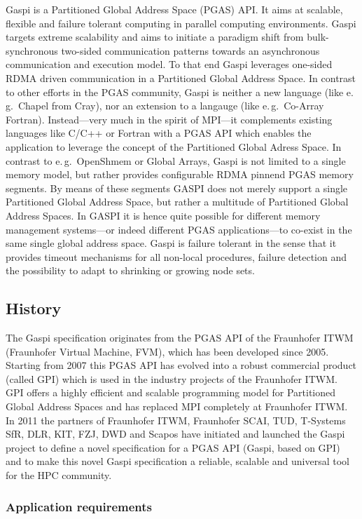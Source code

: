 \documentclass[a4paper]{article}
\newlength{\st}\setlength{\st}{0pt}
\newcommand{\GASPI}{{\sc Gaspi}}
\begin{document}
\GASPI{} is a Partitioned Global Address Space (PGAS) API. It aims at
scalable, flexible and failure tolerant computing in parallel
computing environments.  \GASPI{} targets extreme scalability and aims
to initiate a paradigm shift from bulk-synchronous two-sided
communication patterns towards an asynchronous communication and
execution model. To that end \GASPI{} leverages one-sided RDMA driven
communication in a Partitioned Global Address Space. In contrast to
other efforts in the PGAS community, \GASPI{} is neither a new
language (like e.\,g.\ Chapel from Cray), nor an extension to a
langauge (like e.\,g.\ Co-Array Fortran). Instead---very much in the
spirit of MPI---it complements existing languages like C/C++ or
Fortran with a PGAS API which enables the application to leverage the
concept of the Partitioned Global Adress Space.  In contrast to
e.\,g.\ OpenShmem or Global Arrays, \GASPI{} is not limited to a
single memory model, but rather provides configurable RDMA pinnend
PGAS memory segments.  By means of these segments GASPI does not
merely support a single Partitioned Global Address Space, but rather a
multitude of Partitioned Global Address Spaces. In GASPI it is hence
quite possible for different memory management systems---or indeed
different PGAS applications---to co-exist in the same single global
address space. \GASPI{} is failure tolerant in the sense that it
provides timeout mechanisms for all non-local procedures, failure
detection and the possibility to adapt to shrinking or growing node
sets.

\subsection{History}
The \GASPI{} specification originates from the PGAS API of the Fraunhofer
ITWM (Fraunhofer Virtual Machine, FVM), which has been developed since
2005. Starting from 2007 this PGAS API has evolved into a robust
commercial product (called GPI) which is used in the industry projects
of the Fraunhofer ITWM. GPI offers a highly efficient and scalable
programming model for Partitioned Global Address Spaces and has
replaced MPI completely at Fraunhofer ITWM. In 2011 the partners of
Fraunhofer ITWM, Fraunhofer SCAI, TUD, T-Systems SfR, DLR, KIT, FZJ,
DWD and Scapos have initiated and launched the \GASPI{} project to
define a novel specification for a PGAS API (\GASPI{}, based on GPI) and to
make this novel \GASPI{} specification a reliable, scalable and universal
tool for the HPC community.

\subsubsection{Application requirements}
\end{document}
